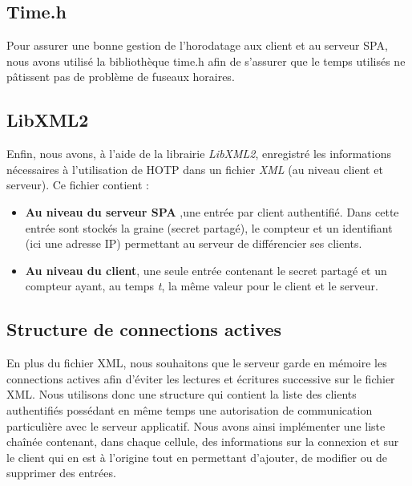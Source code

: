 \subsection{Time.h}
Pour assurer une bonne gestion de l'horodatage aux client et au serveur SPA, nous avons utilisé la bibliothèque time.h
 afin de s'assurer que le temps utilisés ne pâtissent pas de problème de fuseaux horaires.

\subsection{LibXML2}

Enfin, nous avons, à l'aide de la librairie \emph{LibXML2}, enregistré les informations nécessaires à l'utilisation de HOTP dans un fichier \emph{XML} (au niveau client et serveur).
Ce fichier contient :
\begin{itemize}
\item \textbf{Au niveau du serveur SPA} ,une entrée par client authentifié. Dans cette entrée sont stockés la graine (secret partagé), le compteur et un identifiant (ici une adresse IP) permettant au serveur de différencier ses clients.
\item \textbf{Au niveau du client}, une seule entrée contenant le secret partagé et un compteur ayant, au temps \emph{t}, la même valeur pour le client et le serveur.
\end{itemize}

\subsection{Structure de connections actives}
En plus du fichier XML, nous souhaitons que le serveur garde en mémoire les connections actives afin d'éviter les lectures et écritures successive sur le fichier XML. Nous utilisons donc une structure qui contient la liste des clients authentifiés possédant en même temps une autorisation de communication particulière avec le serveur applicatif. Nous avons ainsi implémenter une liste chaînée contenant, dans chaque cellule, des informations sur la connexion et sur le client qui en est à l'origine tout en permettant d'ajouter, de modifier ou de supprimer des entrées.
